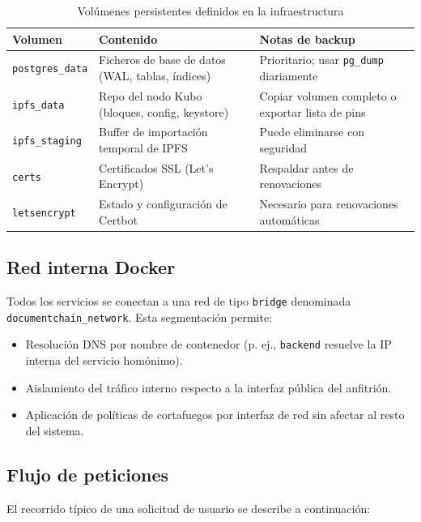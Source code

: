 \documentclass[11pt, a4paper]{article}
\begin{document}
\begin{table}[H]
\centering
\small
\renewcommand{\arraystretch}{1.4}
\begin{tabular}{@{}lp{5cm}p{5.5cm}@{}}
\toprule
\textbf{Volumen} & \textbf{Contenido} & \textbf{Notas de backup} \\
\midrule
\texttt{postgres\_data} & Ficheros de base de datos (WAL, tablas, \'{i}ndices) & Prioritario; usar \texttt{pg\_dump} diariamente \\
\texttt{ipfs\_data} & Repo del nodo Kubo (bloques, config, keystore) & Copiar volumen completo o exportar lista de pins \\
\texttt{ipfs\_staging} & Buffer de importaci\'{o}n temporal de IPFS & Puede eliminarse con seguridad \\
\texttt{certs} & Certificados SSL (Let's Encrypt) & Respaldar antes de renovaciones \\
\texttt{letsencrypt} & Estado y configuraci\'{o}n de Certbot & Necesario para renovaciones autom\'{a}ticas \\
\bottomrule
\end{tabular}
\caption{Vol\'{u}menes persistentes definidos en la infraestructura}
\label{tab:volumenes}
\end{table}

\subsection{Red interna Docker}

Todos los servicios se conectan a una red de tipo \texttt{bridge} denominada \texttt{documentchain\_network}. Esta segmentaci\'{o}n permite:

\begin{itemize}[leftmargin=*]
    \item Resoluci\'{o}n DNS por nombre de contenedor (p. ej., \texttt{backend} resuelve la IP interna del servicio hom\'{o}nimo).
    \item Aislamiento del tr\'{a}fico interno respecto a la interfaz p\'{u}blica del anfitri\'{o}n.
    \item Aplicaci\'{o}n de pol\'{i}ticas de cortafuegos por interfaz de red sin afectar al resto del sistema.
\end{itemize}

\subsection{Flujo de peticiones}

El recorrido t\'{i}pico de una solicitud de usuario se describe a continuaci\'{o}n:
\end{document}
